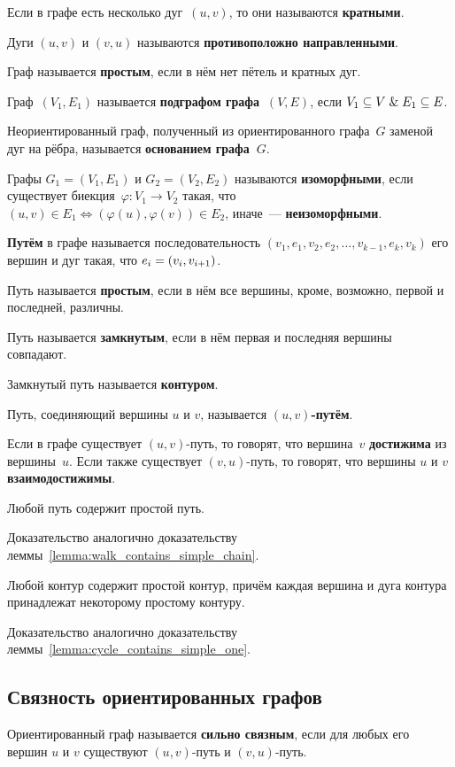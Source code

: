 Если в графе есть несколько дуг~$(u, v)$, то они называются \textbf{кратными}.

Дуги $(u, v)$ и $(v, u)$ называются \textbf{противоположно направленными}.

Граф называется \textbf{простым}, если в нём нет пётель и кратных дуг.

Граф~$(V_1, E_1)$ называется \textbf{подграфом графа~$(V, E)$}, если $V_1 \subseteq V \mathrel{\&} E_1 \subseteq E$.

Неориентированный граф, полученный из ориентированного графа~$G$ заменой дуг на рёбра, называется \textbf{основанием графа~$G$}. 

Графы $G_1 = (V_1, E_1)$ и $G_2 = (V_2, E_2)$ называются \textbf{изоморфными}, если существует биекция~$\varphi \colon V_1 \to V_2$ такая, что
$(u, v) \in E_1 \Leftrightarrow (\varphi(u), \varphi(v)) \in E_2$, иначе~--- \textbf{неизоморфными}.

 \textbf{Путём} в графе называется последовательность $(v_1, e_1, v_2, e_2, \ldots, v_{k-1}, e_k, v_k)$ его вершин и дуг такая, что $e_i \opbr= (v_i, v_{i+1})$.

Путь называется \textbf{простым}, если в нём все вершины, кроме, возможно, первой и последней, различны.

Путь называется \textbf{замкнутым}, если в нём первая и последняя вершины совпадают.

 Замкнутый путь называется \textbf{контуром}.

Путь, соединяющий вершины $u$ и $v$, называется \textbf{$(u, v)$-путём}.

Если в графе существует $(u, v)$-путь, то говорят, что вершина~$v$ \textbf{достижима} из вершины~$u$.
Если также существует $(v, u)$-путь, то говорят, что вершины $u$ и $v$ \textbf{взаимодостижимы}.

\begin{lemma}
Любой путь содержит простой путь.
\end{lemma}%
Доказательство аналогично доказательству леммы~\ref{lemma:walk_contains_simple_chain}.

\begin{lemma}
Любой контур содержит простой контур, причём каждая вершина и дуга контура принадлежат некоторому простому контуру.
\end{lemma}%
Доказательство аналогично доказательству леммы~\ref{lemma:cycle_contains_simple_one}.

\subsection{Связность ориентированных графов}
Ориентированный граф называется \textbf{сильно связным}, если для любых его вершин $u$ и $v$ существуют $(u, v)$-путь и $(v, u)$-путь.

